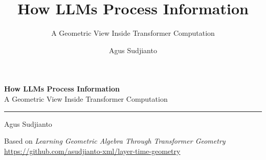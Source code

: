 \documentclass[aspectratio=169, 11pt]{beamer}
\title{How LLMs Process Information}
\subtitle{A Geometric View Inside Transformer Computation}
\author{Agus Sudjianto}
\date{\vspace{-1em}}
\institute{%
  \scriptsize Based on \emph{Learning Geometric Algebra Through Transformer Geometry}\\[1pt]
  \scriptsize\url{https://github.com/asudjianto-xml/layer-time-geometry}%
}
\begin{document}
\begin{frame}
\vspace{1.5cm}
{\Large\bfseries How LLMs Process Information}\\[4pt]
{\normalsize A Geometric View Inside Transformer Computation}

\vspace{0.8cm}
\textcolor{Teal}{\rule{0.4\textwidth}{0.8pt}}

\vspace{0.6cm}
{\normalsize Agus Sudjianto}

\vspace{0.4cm}
{\scriptsize Based on \emph{Learning Geometric Algebra Through Transformer Geometry}}\\[2pt]
{\scriptsize\url{https://github.com/asudjianto-xml/layer-time-geometry}}
\end{frame}
\end{document}
